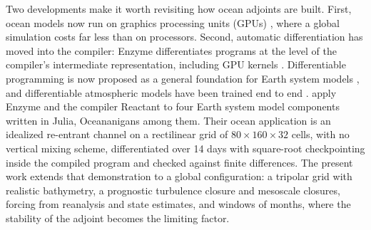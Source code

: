 \documentclass[11pt]{article}
\begin{document}
Two developments make it worth revisiting how ocean adjoints are built. First, ocean models now run on graphics
processing units (GPUs) \citep{hafner2021, silvestri2025}, where a global simulation costs far less than on
processors. Second, automatic differentiation has moved into the compiler: Enzyme differentiates programs at the
level of the compiler's intermediate representation, including GPU kernels \citep{moses2020, moses2021}.
Differentiable programming is now proposed as a general foundation for Earth system models
\citep{gelbrecht2023}, and differentiable atmospheric models have been trained end to end \citep{kochkov2024}.
\citet{oceananigansenzyme} apply Enzyme and the compiler Reactant \citep{reactant} to four Earth system model
components written in Julia, Oceananigans among them. Their ocean application is an idealized re-entrant channel
on a rectilinear grid of $80\times160\times32$ cells, with no vertical mixing scheme, differentiated over 14 days
with square-root checkpointing inside the compiled program and checked against finite differences. The present
work extends that demonstration to a global configuration: a tripolar grid with realistic bathymetry, a
prognostic turbulence closure and mesoscale closures, forcing from reanalysis and state estimates, and windows of
months, where the stability of the adjoint becomes the limiting factor.
\end{document}
